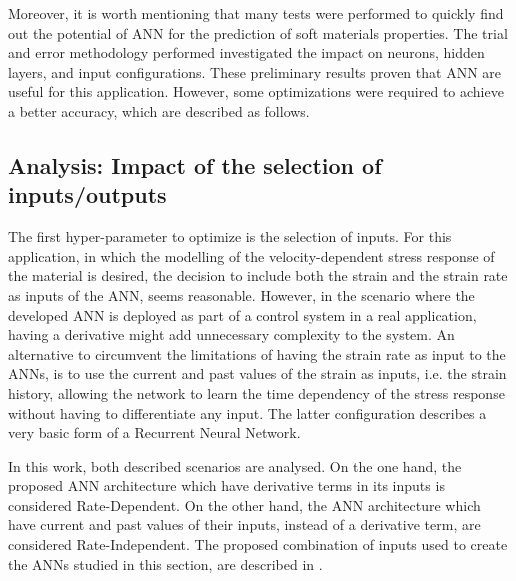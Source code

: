Moreover, it is worth mentioning that many tests were performed to quickly find out the potential of ANN for the prediction of soft materials properties. The trial and error methodology performed investigated the impact on neurons, hidden layers, and input configurations. These preliminary results proven that ANN are useful for this application. However, some optimizations were required to achieve a better accuracy, which are described as follows.

\subsection{Analysis: Impact of the selection of inputs/outputs}

The first hyper-parameter to optimize is the selection of inputs. For this application, in which the modelling of the velocity-dependent stress response of the material is desired, the decision to include both the strain and the strain rate as inputs of the ANN, seems reasonable. However, in the scenario where the developed ANN is deployed as part of a control system in a real application, having a derivative might add unnecessary complexity to the system. An alternative to circumvent the limitations of having the strain rate as input to the ANNs, is to use the current and past values of the strain as inputs, i.e. the strain history, allowing the network to learn the time dependency of the stress response without having to differentiate any input. The latter configuration describes a very basic form of a Recurrent Neural Network. 

In this work, both described scenarios are analysed. On the one hand, the proposed ANN architecture which have derivative terms in its inputs is considered Rate-Dependent. On the other hand, the ANN architecture which have current and past values of their inputs, instead of a derivative term, are considered Rate-Independent. The proposed combination of inputs used to create the ANNs studied in this section, are described in .

